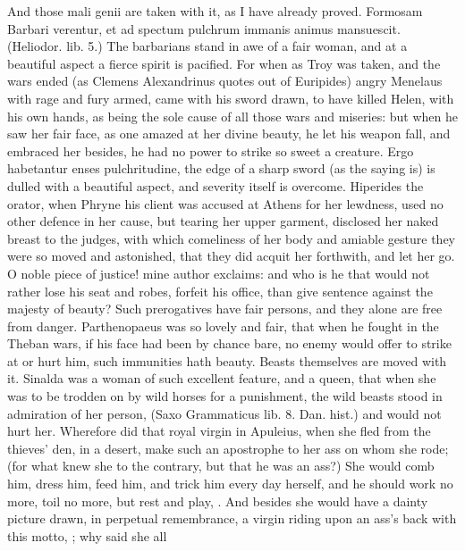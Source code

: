 {And those mali genii are taken with it, as I have already proved.
Formosam Barbari verentur, et ad spectum pulchrum immanis animus
mansuescit. (Heliodor. lib. 5.) The barbarians stand in awe of a fair
woman, and at a beautiful aspect a fierce spirit is pacified. For when
as Troy was taken, and the wars ended (as Clemens Alexandrinus
quotes out of Euripides) angry Menelaus with rage and fury armed, came
with his sword drawn, to have killed Helen, with his own hands, as
being the sole cause of all those wars and miseries: but when he saw
her fair face, as one amazed at her divine beauty, he let his weapon
fall, and embraced her besides, he had no power to strike so sweet a
creature. Ergo habetantur enses pulchritudine, the edge of a sharp
sword (as the saying is) is dulled with a beautiful aspect, and
severity itself is overcome. Hiperides the orator, when Phryne his
client was accused at Athens for her lewdness, used no other defence in
her cause, but tearing her upper garment, disclosed her naked breast to
the judges, with which comeliness of her body and amiable gesture they
were so moved and astonished, that they did acquit her forthwith, and
let her go. O noble piece of justice! mine author exclaims: and who is
he that would not rather lose his seat and robes, forfeit his office,
than give sentence against the majesty of beauty? Such prerogatives
have fair persons, and they alone are free from danger. Parthenopaeus
was so lovely and fair, that when he fought in the Theban wars, if his
face had been by chance bare, no enemy would offer to strike at or hurt
him, such immunities hath beauty. Beasts themselves are moved with it.
Sinalda was a woman of such excellent feature, and a queen, that
when she was to be trodden on by wild horses for a punishment, the wild
beasts stood in admiration of her person, (Saxo Grammaticus lib. 8.
Dan. hist.) and would not hurt her. Wherefore did that royal virgin in
Apuleius, when she fled from the thieves' den, in a desert, make
such an apostrophe to her ass on whom she rode; (for what knew she to
the contrary, but that he was an ass?)  She would comb him, dress him, feed him, and trick him
every day herself, and he should work no more, toil no more, but rest
and play, \etc{}. And besides she would have a dainty picture drawn, in
perpetual remembrance, a virgin riding upon an ass's back with this
motto, ; why said she all
}
